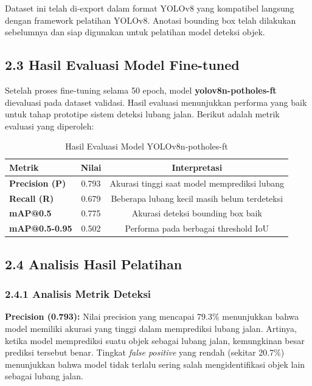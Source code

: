 \documentclass[12pt,a4paper]{article}
\begin{document}
Dataset ini telah di-export dalam format YOLOv8 yang kompatibel langsung dengan framework pelatihan YOLOv8. Anotasi bounding box telah dilakukan sebelumnya dan siap digunakan untuk pelatihan model deteksi objek.


\subsection*{2.3 Hasil Evaluasi Model Fine-tuned}

Setelah proses fine-tuning selama 50 epoch, model \textbf{yolov8n-potholes-ft} dievaluasi pada dataset validasi. Hasil evaluasi menunjukkan performa yang baik untuk tahap prototipe sistem deteksi lubang jalan. Berikut adalah metrik evaluasi yang diperoleh:

\begin{table}[h]
\centering
\caption{Hasil Evaluasi Model YOLOv8n-potholes-ft}
\label{tab:hasil-evaluasi}
\begin{tabular}{@{}lcc@{}}
\toprule
\textbf{Metrik} & \textbf{Nilai} & \textbf{Interpretasi} \\
\midrule
\textbf{Precision (P)} & 0.793 & Akurasi tinggi saat model memprediksi lubang \\
\textbf{Recall (R)} & 0.679 & Beberapa lubang kecil masih belum terdeteksi \\
\textbf{mAP@0.5} & 0.775 & Akurasi deteksi bounding box baik \\
\textbf{mAP@0.5-0.95} & 0.502 & Performa pada berbagai threshold IoU \\
\bottomrule
\end{tabular}
\end{table}

\subsection*{2.4 Analisis Hasil Pelatihan}

\subsubsection*{2.4.1 Analisis Metrik Deteksi}

\textbf{Precision (0.793):} Nilai precision yang mencapai 79.3\% menunjukkan bahwa model memiliki akurasi yang tinggi dalam memprediksi lubang jalan. Artinya, ketika model memprediksi suatu objek sebagai lubang jalan, kemungkinan besar prediksi tersebut benar. Tingkat \textit{false positive} yang rendah (sekitar 20.7\%) menunjukkan bahwa model tidak terlalu sering salah mengidentifikasi objek lain sebagai lubang jalan.
\end{document}
